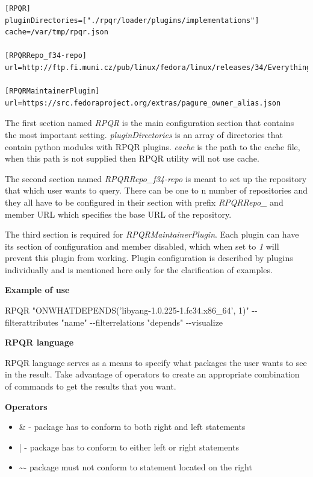 \begin{lstlisting}
[RPQR]
pluginDirectories=["./rpqr/loader/plugins/implementations"]
cache=/var/tmp/rpqr.json

[RPQRRepo_f34-repo]
url=http://ftp.fi.muni.cz/pub/linux/fedora/linux/releases/34/Everything/x86_64/os/

[RPQRMaintainerPlugin]
url=https://src.fedoraproject.org/extras/pagure_owner_alias.json
\end{lstlisting}

The first section named \textit{RPQR} is the main configuration section that contains the most important
setting. \textit{pluginDirectories} is an array of directories that contain python modules with RPQR
plugins. \textit{cache} is the path to the cache file, when this path is not supplied then RPQR utility
will not use cache.

The second section named \textit{RPQRRepo\_f34-repo} is meant to set up the repository that which user wants to
query. There can be one to n number of repositories and they all have to be configured in their 
section with prefix \textit{RPQRRepo\_} and member URL which specifies the base URL of the repository.

The third section is required for \textit{RPQRMaintainerPlugin}. Each plugin can have its section
of configuration and member disabled, which when set to \textit{1} will prevent this plugin from
working. Plugin configuration is described by plugins individually and is mentioned here only for
the clarification of examples.

\textbf{Example of use}

RPQR "ONWHATDEPENDS('libyang-1.0.225-1.fc34.x86\_64', 1)" -{}-filterattributes "name" -{}-filterrelations "depends" -{}-visualize

\textbf{RPQR language}

RPQR language serves as a means to specify what packages the user wants to see in the result. Take advantage
of operators to create an appropriate combination of commands to get the results that you want.

\newpage

\textbf{Operators}

\begin{itemize}
  \item \& - package has to conform to both right and left statements
  \item  | - package has to conform to either left or right statements
  \item  \textasciitilde - package must not conform to statement located on the right 
\end{itemize}

